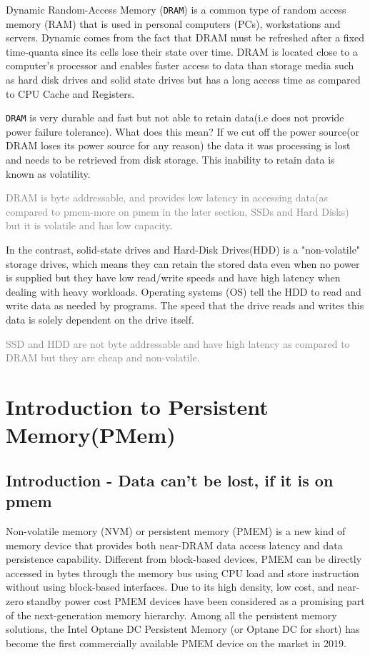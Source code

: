 \documentclass[11pt,swedish, openany, oneside]{book}
\begin{document}
Dynamic Random-Access Memory (\texttt{DRAM}) is a common type of random access memory (RAM) that is used in personal computers (PCs), workstations and servers. Dynamic comes from the fact that DRAM must be refreshed after a fixed time-quanta since its cells lose their state over time. DRAM is located close to a computer's processor and enables faster access to data than storage media such as hard disk drives and solid state drives but has a long access time as compared to CPU Cache and Registers.

\texttt{DRAM} is very durable and fast but not able to retain data(i.e does not provide power failure tolerance). What does this mean? If we cut off the power source(or DRAM loses its power source for any reason) the data it was processing is lost and needs to be retrieved from disk storage. This inability to retain data is known as volatility.\cite{ibm}

\textcolor{gray}{DRAM is byte addressable, and provides low latency in accessing data(as compared to pmem-more on pmem in the later section, SSDs and Hard Disks) but it is volatile and has low capacity}.

In the contrast, solid-state drives and Hard-Disk Drives(HDD) is a "non-volatile" storage drives, which means they can retain the stored data even when no power is supplied but they have low read/write speeds and have high latency when dealing with heavy workloads.  Operating systems (OS) tell the HDD to read and write data as needed by programs. The speed that the drive reads and writes this data is solely dependent on the drive itself.\cite{ibm}

\textcolor{gray}{SSD and HDD are not byte addressable and have high latency as compared to DRAM but they are cheap and non-volatile.}




\chapter{Introduction to Persistent Memory(PMem)}
\section{Introduction - Data can't be lost, if it is on pmem}
Non-volatile memory (NVM) or persistent memory (PMEM) is a new kind of memory device that provides both near-DRAM data access latency and data persistence capability. Different from block-based devices, PMEM can be directly accessed in bytes through the memory bus using CPU load and store instruction without using block-based interfaces. Due to its high density, low cost, and near-zero standby power cost PMEM devices have been considered as a promising part of the next-generation memory hierarchy. Among all the persistent memory solutions, the Intel Optane DC Persistent Memory
(or Optane DC for short) has become the first commercially available PMEM device on the market in 2019.\cite{islam_narayanan_york_dai}
\end{document}
